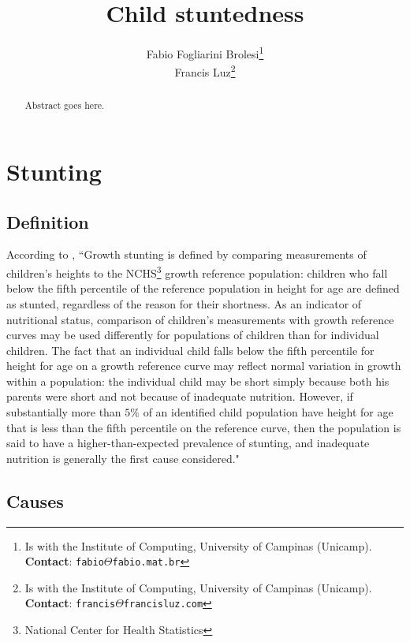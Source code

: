 \documentclass[10pt,twocolumn,letterpaper]{article}
\begin{document}
\title{Child stuntedness}
\author{Fabio Fogliarini Brolesi\thanks{Is with the Institute of Computing, University of Campinas (Unicamp). \textbf{Contact}: \tt\small{fabio$\Theta$fabio.mat.br}}\\
Francis Luz\thanks{Is with the Institute of Computing, University of Campinas (Unicamp). \textbf{Contact}: \tt\small{francis$\Theta$francisluz.com}}
}


\maketitle
\begin{abstract}
Abstract goes here.
\end{abstract}

\section{Stunting}
\subsection{Definition}
According to \cite{Lewit}, ``Growth stunting is defined by comparing measurements of children's heights to the NCHS\footnote{National Center for Health Statistics} growth reference population: children who fall below the fifth percentile of the reference population in height for age are defined as stunted, regardless of the reason for their shortness. As an indicator of nutritional status, comparison of children's measurements with growth reference curves may be used differently for populations of children than for individual children. The fact that an individual child falls below the fifth percentile for height for age on a growth reference curve may reflect normal variation in growth within a population: the individual child may be short simply because both his parents were short and not because of inadequate nutrition. However, if substantially more than $5\%$ of an identified child population have height for age that is less than the fifth percentile on the reference curve, then the population is said to have a higher-than-expected prevalence of stunting, and inadequate nutrition is generally the first cause considered."

\subsection {Causes}
\end{document}
